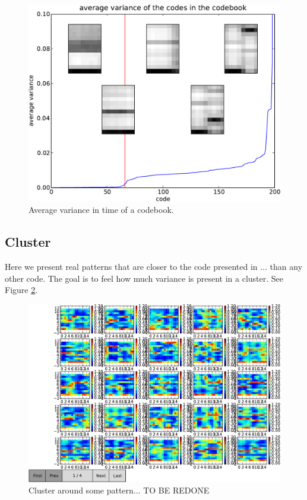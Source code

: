 \documentclass{article}
\begin{document}
\begin{figure}[htb]
\begin{center}
\includegraphics[width=.9\columnwidth]{code_variance}
\end{center}
\caption{\small{Average variance in time of a codebook.}}
\label{fig:code_var}
\end{figure}

\subsection{Cluster}
Here we present real patterns that are closer to the code presented in ...
than any other code. The goal is to feel how much variance is present in
a cluster. See Figure \ref{fig:cluster}.

\begin{figure}[htb]
\begin{center}
\includegraphics[width=.9\columnwidth]{close_patterns1}
\end{center}
\caption{\small{Cluster around some pattern... TO BE REDONE}}
\label{fig:cluster}
\end{figure}
\end{document}
